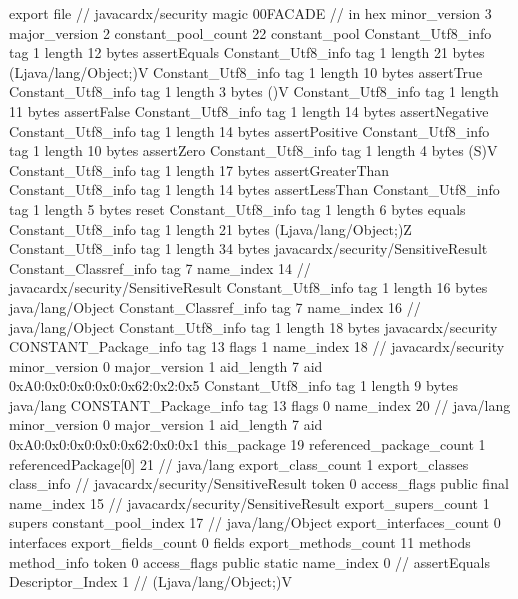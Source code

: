 export file {		// javacardx/security
	magic	00FACADE		 // in hex
	minor_version	3
	major_version	2
	constant_pool_count	22
	constant_pool {
		Constant_Utf8_info {
			tag	1
			length	12
			bytes	assertEquals
		}
		Constant_Utf8_info {
			tag	1
			length	21
			bytes	(Ljava/lang/Object;)V
		}
		Constant_Utf8_info {
			tag	1
			length	10
			bytes	assertTrue
		}
		Constant_Utf8_info {
			tag	1
			length	3
			bytes	()V
		}
		Constant_Utf8_info {
			tag	1
			length	11
			bytes	assertFalse
		}
		Constant_Utf8_info {
			tag	1
			length	14
			bytes	assertNegative
		}
		Constant_Utf8_info {
			tag	1
			length	14
			bytes	assertPositive
		}
		Constant_Utf8_info {
			tag	1
			length	10
			bytes	assertZero
		}
		Constant_Utf8_info {
			tag	1
			length	4
			bytes	(S)V
		}
		Constant_Utf8_info {
			tag	1
			length	17
			bytes	assertGreaterThan
		}
		Constant_Utf8_info {
			tag	1
			length	14
			bytes	assertLessThan
		}
		Constant_Utf8_info {
			tag	1
			length	5
			bytes	reset
		}
		Constant_Utf8_info {
			tag	1
			length	6
			bytes	equals
		}
		Constant_Utf8_info {
			tag	1
			length	21
			bytes	(Ljava/lang/Object;)Z
		}
		Constant_Utf8_info {
			tag	1
			length	34
			bytes	javacardx/security/SensitiveResult
		}
		Constant_Classref_info {
			tag	7
			name_index	14		// javacardx/security/SensitiveResult
		}
		Constant_Utf8_info {
			tag	1
			length	16
			bytes	java/lang/Object
		}
		Constant_Classref_info {
			tag	7
			name_index	16		// java/lang/Object
		}
		Constant_Utf8_info {
			tag	1
			length	18
			bytes	javacardx/security
		}
		CONSTANT_Package_info {
			tag	13
			flags	1
			name_index	18		// javacardx/security
			minor_version	0
			major_version	1
			aid_length	7
			aid	0xA0:0x0:0x0:0x0:0x62:0x2:0x5
		}
		Constant_Utf8_info {
			tag	1
			length	9
			bytes	java/lang
		}
		CONSTANT_Package_info {
			tag	13
			flags	0
			name_index	20		// java/lang
			minor_version	0
			major_version	1
			aid_length	7
			aid	0xA0:0x0:0x0:0x0:0x62:0x0:0x1
		}
	}
	this_package	19
	referenced_package_count	1
	referencedPackage[0]	21		// java/lang
	export_class_count	1
	export_classes {
		class_info {		// javacardx/security/SensitiveResult
			token	0
			access_flags	public final
			name_index	15		// javacardx/security/SensitiveResult
			export_supers_count	1
			supers {
				constant_pool_index	17		// java/lang/Object
			}
			export_interfaces_count	0
			interfaces {
			}
			export_fields_count	0
			fields {
			}
			export_methods_count	11
			methods {
				method_info {
					token	0
					access_flags	public static
					name_index	0		// assertEquals
					Descriptor_Index	1		// (Ljava/lang/Object;)V
}}}}}
